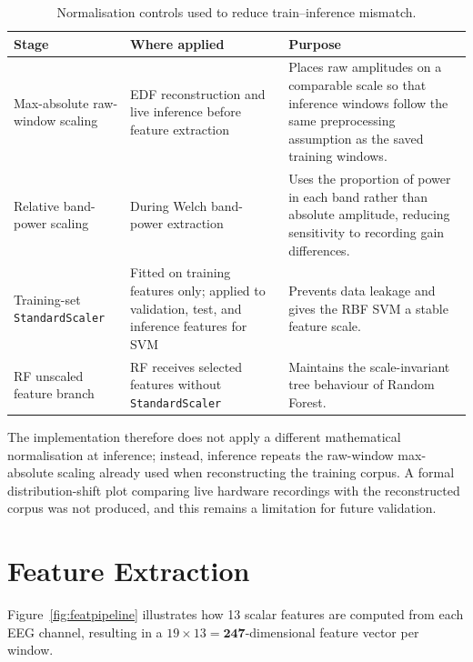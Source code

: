 \documentclass[12pt, a4paper]{report}
\begin{document}
\begin{table}[H]
  \centering
  \caption{Normalisation controls used to reduce train--inference mismatch.}
  \label{tab:normalisation_controls}
  \footnotesize
  \renewcommand{\arraystretch}{1.18}
  \begin{tabularx}{\textwidth}{>{\raggedright\arraybackslash}p{3.4cm}
                              >{\raggedright\arraybackslash}p{4.3cm}
                              >{\raggedright\arraybackslash}X}
    \toprule
    \textbf{Stage} & \textbf{Where applied} & \textbf{Purpose} \\
    \midrule
    Max-absolute raw-window scaling &
    EDF reconstruction and live inference before feature extraction &
    Places raw amplitudes on a comparable scale so that inference windows
    follow the same preprocessing assumption as the saved training windows. \\
    Relative band-power scaling &
    During Welch band-power extraction &
    Uses the proportion of power in each band rather than absolute amplitude,
    reducing sensitivity to recording gain differences. \\
    Training-set \texttt{StandardScaler} &
    Fitted on training features only; applied to validation, test, and
    inference features for SVM &
    Prevents data leakage and gives the RBF SVM a stable feature scale. \\
    RF unscaled feature branch &
    RF receives selected features without \texttt{StandardScaler} &
    Maintains the scale-invariant tree behaviour of Random Forest. \\
    \bottomrule
  \end{tabularx}
\end{table}

The implementation therefore does not apply a different mathematical
normalisation at inference; instead, inference repeats the raw-window
max-absolute scaling already used when reconstructing the training corpus.
A formal distribution-shift plot comparing live hardware recordings with
the reconstructed corpus was not produced, and this remains a limitation
for future validation.

\section{Feature Extraction}
\label{sec:features}

Figure~\ref{fig:featpipeline} illustrates how 13 scalar features are
computed from each EEG channel, resulting in a
$19 \times 13 = \mathbf{247}$-dimensional feature vector per window.
\end{document}
